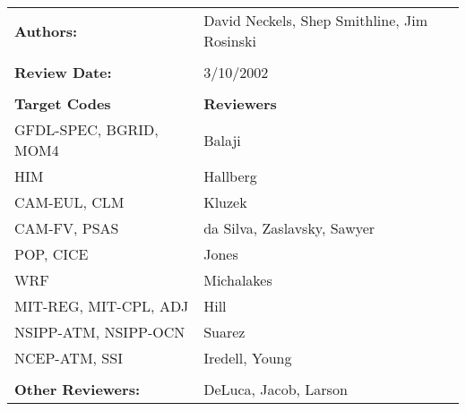
\begin{tabular}{l l}

{\bf Authors:} & David Neckels, Shep Smithline, Jim Rosinski \\ \\

{\bf Review Date:}          & 3/10/2002 \\ \\

{\bf Target Codes}            & {\bf Reviewers} \\
GFDL-SPEC, BGRID, MOM4        & Balaji \\ 
HIM                           & Hallberg \\
CAM-EUL, CLM                  & Kluzek \\
CAM-FV, PSAS                  & da Silva, Zaslavsky, Sawyer\\
POP, CICE                     & Jones \\
WRF                           & Michalakes \\
MIT-REG, MIT-CPL, ADJ         & Hill \\
NSIPP-ATM, NSIPP-OCN          & Suarez \\
NCEP-ATM, SSI                 & Iredell, Young \\ \\

{\bf Other Reviewers:}        & DeLuca, Jacob, Larson

\end{tabular}



